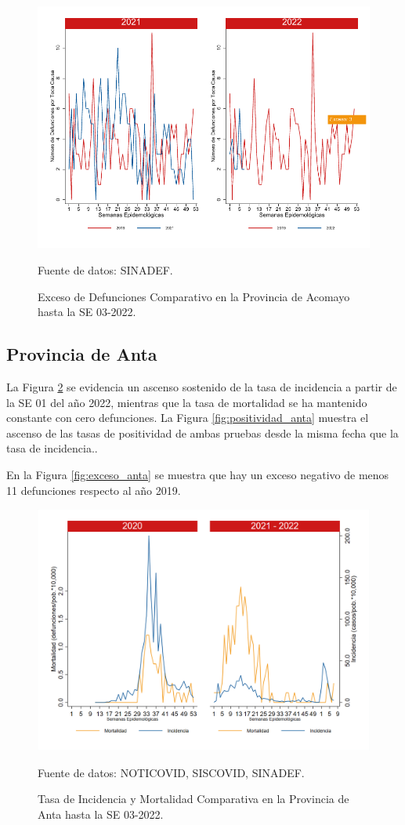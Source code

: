 \documentclass[12pt,a4paper,openany]{book}
\begin{document}
		\begin{figure}[h]
			\caption{Exceso de Defunciones Comparativo en la Provincia de Acomayo hasta la SE 03-2022.}\label{fig:exceso_acomayo}
			\begin{center}
				\includegraphics[width=0.7\linewidth]{../figuras/exceso_1.pdf}
			\end{center}
			{\footnotesize {Fuente de datos: SINADEF.}}
		\end{figure}
		
		\clearpage
		
		\subsection*{Provincia de Anta}
		\noindent La Figura \ref{fig:inc_mort_anta}  se evidencia un ascenso sostenido de la tasa de incidencia a partir de la SE 01 del año 2022, mientras que la tasa de mortalidad se ha mantenido constante con cero defunciones. 
		\noindent La Figura
		\ref{fig:positividad_anta} muestra el ascenso de las tasas de positividad de ambas pruebas desde la misma fecha que la tasa de incidencia.. 
		
		En la Figura \ref{fig:exceso_anta} se muestra que hay un exceso negativo de menos 11 defunciones respecto al año 2019.
		
		\begin{figure}[h]
			\caption{Tasa de Incidencia y Mortalidad Comparativa en la Provincia de Anta hasta la SE 03-2022.}\label{fig:inc_mort_anta}
			\begin{center}
				\includegraphics[width=0.7\linewidth]{../figuras/incidencia_mortalidad_20_21_2.png}
			\end{center}
			{\footnotesize {Fuente de datos: NOTICOVID, SISCOVID, SINADEF.}}
		\end{figure}
		
\end{document}
